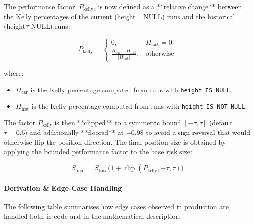 \documentclass[10pt]{article}
\begin{document}
The performance factor, $P_{\text{kelly}}$, is now defined as a **relative change** between the Kelly percentages of the current (height = NULL) runs and the historical (height ≠ NULL) runs:

\begin{equation}
\label{eq:kelly-performance}
P_{\text{kelly}} =
\begin{cases}
0, & H_{\text{hist}} = 0 \\[6pt]
\displaystyle
\frac{H_{\text{cur}} - H_{\text{hist}}}{\lvert H_{\text{hist}} \rvert},
& \text{otherwise}
\end{cases}
\end{equation}

where:
\begin{itemize}
    \item $H_{\text{cur}}$ is the Kelly percentage computed from runs with \texttt{height IS NULL}.
    \item $H_{\text{hist}}$ is the Kelly percentage computed from runs with \texttt{height IS NOT NULL}.
\end{itemize}

The factor $P_{\text{kelly}}$ is then **clipped** to a symmetric bound $[-\tau,\tau]$ (default $\tau = 0.5$) and additionally **floored** at $-0.98$ to avoid a sign reversal that would otherwise flip the position direction. The final position size is obtained by applying the bounded performance factor to the base risk size:

\begin{equation}
\label{eq:kelly-adjusted}
S_{\text{final}} = S_{\text{base}} \bigl(1 + \operatorname{clip}(P_{\text{kelly}}, -\tau, \tau)\bigr)
\end{equation}

\paragraph{Derivation \& Edge‑Case Handling}
The following table summarises how edge cases observed in production are handled both in code and in the mathematical description:
\end{document}
